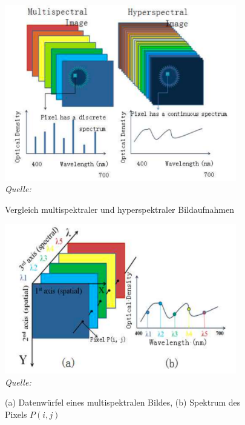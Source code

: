 \begin{figure}[H]
    \caption {Vergleich multispektraler und hyperspektraler Bildaufnahmen}\label{fig:multispectral_hyperspectral}
    \includegraphics[width=0.9\textwidth]{abbildungen/multispectral_hyperspectral.png}
    \\
    \textit{Quelle:~\cite[][]{ibraheem.2015}}
    \\
\end{figure}

\begin{figure}[H]
    \caption {(a) Datenwürfel eines multispektralen Bildes, (b) Spektrum des Pixels \(P(i,j)\)}
    \label{fig:datacube_multispectral}
    \includegraphics[width=0.9\textwidth]{abbildungen/datacube_spectral.png}
    \\
    \textit{Quelle:~\cite[][]{ibraheem.2015}}
    \\
\end{figure}

